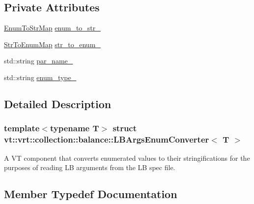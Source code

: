 \subsection*{Private Attributes}
\begin{DoxyCompactItemize}
\item 
\hyperlink{structvt_1_1vrt_1_1collection_1_1balance_1_1_l_b_args_enum_converter_ab4e2b0c525c1ea76f18f2ff45733f3c4}{Enum\+To\+Str\+Map} \hyperlink{structvt_1_1vrt_1_1collection_1_1balance_1_1_l_b_args_enum_converter_ab4c64192522847d62019adb796824da3}{enum\+\_\+to\+\_\+str\+\_\+}
\item 
\hyperlink{structvt_1_1vrt_1_1collection_1_1balance_1_1_l_b_args_enum_converter_a4addf8d7b128d0e5de627e60b4c299bf}{Str\+To\+Enum\+Map} \hyperlink{structvt_1_1vrt_1_1collection_1_1balance_1_1_l_b_args_enum_converter_aae1662ab7a78192d215aa616fac03de6}{str\+\_\+to\+\_\+enum\+\_\+}
\item 
std\+::string \hyperlink{structvt_1_1vrt_1_1collection_1_1balance_1_1_l_b_args_enum_converter_a3e7e8c3f195b637ca0286405d5f64e67}{par\+\_\+name\+\_\+}
\item 
std\+::string \hyperlink{structvt_1_1vrt_1_1collection_1_1balance_1_1_l_b_args_enum_converter_a5e0b1ba18d8083c384c281f0a08567e9}{enum\+\_\+type\+\_\+}
\end{DoxyCompactItemize}


\subsection{Detailed Description}
\subsubsection*{template$<$typename T$>$\newline
struct vt\+::vrt\+::collection\+::balance\+::\+L\+B\+Args\+Enum\+Converter$<$ T $>$}

A VT component that converts enumerated values to their stringifications for the purposes of reading LB arguments from the LB spec file. 

\subsection{Member Typedef Documentation}
\mbox{\label{structvt_1_1vrt_1_1collection_1_1balance_1_1_l_b_args_enum_converter_ab4e2b0c525c1ea76f18f2ff45733f3c4}} 

